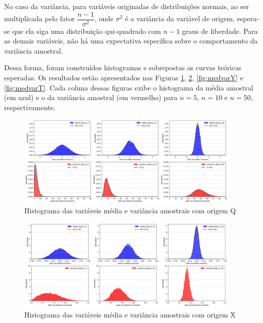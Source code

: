 \documentclass[]{abntex2}
\begin{document}
No caso da variância, para variáveis originadas de distribuições normais, ao ser multiplicada pelo fator $\dfrac{n-1}{\sigma^2}$, onde $\sigma^2$ é a variância da variável de origem, espera-se que ela siga uma distribuição qui-quadrado com \( n - 1 \) graus de liberdade. Para as demais variáveis, não há uma expectativa específica sobre o comportamento da variância amostral.

Dessa forma, foram construídos histogramas e sobrepostas as curvas teóricas esperadas. Os resultados estão apresentados nas Figuras \ref{fig:medvarQ}, \ref{fig:medvarX}, \ref{fig:medvarY} e \ref{fig:medvarT}. Cada coluna dessas figuras exibe o histograma da média amostral (em azul) e o da variância amostral (em vermelho) para \( n = 5 \), \( n = 10 \) e \( n = 50 \), respectivamente.

\begin{figure}
    \centering 
    \includegraphics[width=0.95\textwidth]{imgs/medvarQ.png}
    \caption{Histograma das variáveis média e variância amostrais com origem Q}
    \label{fig:medvarQ} %
\end{figure}

\begin{figure}
    \centering 
    \includegraphics[width=0.95\textwidth]{imgs/medvarX.png}
    \caption{Histograma das variáveis média e variância amostrais com origem X}
    \label{fig:medvarX} %
\end{figure}
\end{document}
